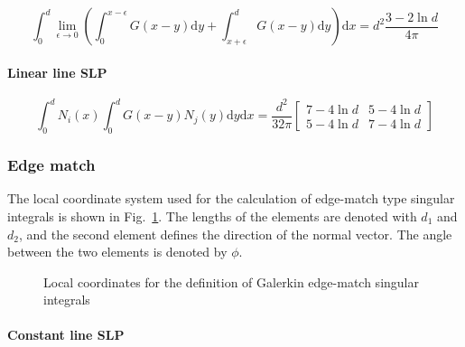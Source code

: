 \documentclass[a4paper,11pt]{article}
\newcommand{\td}{\mathrm{d}}
\begin{document}
\begin{equation}
\int_{0}^{d}
\lim_{\epsilon \to 0}
\left(
\int_{0}^{x-\epsilon} G(x-y) \td y
+
\int_{x+\epsilon}^{d} G(x-y) \td y
\right)
\td x
=
d^2\frac{3-2\ln d}{4\pi}
\end{equation}

\paragraph{Linear line SLP}

\begin{equation}
\int_{0}^{d} N_i(x) \int_{0}^{d} G(x-y) N_j(y) \td y \td x
=
\frac{d^2}{32\pi} \begin{bmatrix}
7-4 \ln d & 5 - 4 \ln d \\
5-4 \ln d & 7 - 4 \ln d
\end{bmatrix}
\end{equation}

\subsubsection{Edge match}

The local coordinate system used for the calculation of edge-match type singular integrals is shown in Fig.~\ref{fig:local_galerkin_edge}. The lengths of the elements are denoted with $d_1$ and $d_2$, and the second element defines the direction of the normal vector. The angle between the two elements is denoted by $\phi$.

\begin{figure}
\center
{}
\caption{Local coordinates for the definition of Galerkin edge-match singular integrals}
\label{fig:local_galerkin_edge}
\end{figure}

\paragraph{Constant line SLP}
\end{document}
